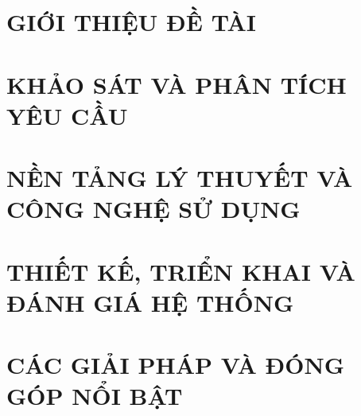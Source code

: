 \documentclass[a4paper,13pt,3p,twoside]{report}
\theoremstyle{definition}
\begin{document}
\renewcommand{\listtablename}{DANH MỤC BẢNG BIỂU}
{\let\oldnumberline\numberline
\renewcommand{\numberline}{Bảng~\oldnumberline}
\listoftables}

\glsaddall 
 \renewcommand*{\glossaryname}{Danh sách thuật ngữ}
\renewcommand*{\acronymname}{DANH MỤC THUẬT NGỮ VÀ TỪ VIẾT TẮT}
\renewcommand*{\entryname}{Thuật ngữ}
\renewcommand*{\descriptionname}{Ý nghĩa}
\printnoidxglossaries


% 


\newpage
{}

\pagestyle{fancy}
\fancyhf{}
\fancyhead[RE, LO]{\leftmark}
\fancyfoot[RE, LO]{\thepage}

\chapter{GIỚI THIỆU ĐỀ TÀI}
\label{chapter:Introduction}

\newpage
\chapter{KHẢO SÁT VÀ PHÂN TÍCH YÊU CẦU}
\label{chapter:Related_works}



\newpage
\chapter{NỀN TẢNG LÝ THUYẾT VÀ CÔNG NGHỆ SỬ DỤNG}
\label{chapter:Methodology}


\newpage
\chapter{THIẾT KẾ, TRIỂN KHAI VÀ ĐÁNH GIÁ HỆ THỐNG}
\label{chapter:Experiment}


\newpage
\chapter{CÁC GIẢI PHÁP VÀ ĐÓNG GÓP NỔI BẬT}
\label{chapter:SolutionAndContribution}

\newpage
\end{document}
